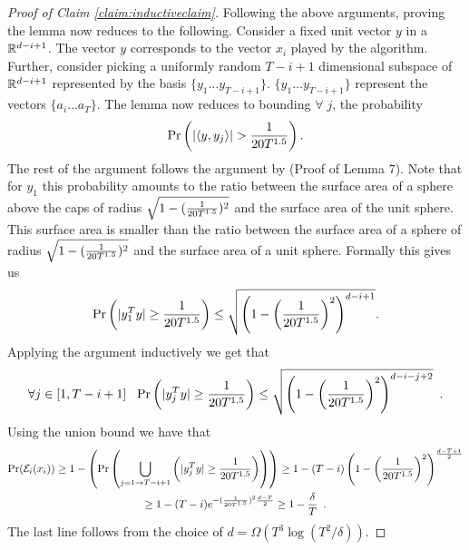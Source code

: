 \begin{proof}[Proof of Claim \ref{claim:inductiveclaim}]
  Following the above arguments, proving the lemma now reduces to the following. Consider a fixed unit vector $y$ in a ${\mathbb R}^{d-i+1}$. The vector $y$ corresponds to the vector $x_i$ played by the algorithm. Further, consider picking a uniformly random $T - i + 1$ dimensional subspace of ${\mathbb R}^{d - i + 1}$ represented by the basis $\{y_1 \ldots y_{T-i+1}\}$. $\{y_1 \ldots y_{T - i +1}\}$ represent the vectors $\{a_i \ldots a_T\}$. The lemma now reduces to bounding $\forall\;j$, the probability 
  \[\mathrm{Pr}\left(|\langle y, y_j \rangle| > \frac{1}{20T^{1.5}}\right) .\]
  The rest of the argument follows the argument by \cite{WoodworthSrebro2016}(Proof of Lemma 7). Note that 
  for $y_1$ this probability amounts to the ratio between the surface area of a sphere above the caps of radius $\sqrt{1 - (\frac{1}{20T^{1.5}})^2}$ and the surface area of the unit sphere. This surface area is smaller than the ratio between the surface area of a sphere of radius $\sqrt{1 - (\frac{1}{20T^{1.5}})^2}$ and the surface area of a unit sphere. Formally this gives us 
  \[ \mathrm{Pr}\left(|y_1^T y| \geq \frac{1}{20T^{1.5}}\right) \leq \sqrt{\left(1 - \left(\frac{1}{20T^{1.5}}\right)^2\right)^{d-i+1}}.\]
  Applying the argument inductively we get that
  \[ \forall j \in [1, T-i+1] \;\;\; \mathrm{Pr}\left(|y_j^T y| \geq \frac{1}{20T^{1.5}}\right) \leq \sqrt{\left(1 - \left(\frac{1}{20T^{1.5}}\right)^2\right)^{d-i-j+2}}\enspace.\]
  Using the union bound we have that
  \begin{multline}
    \mathrm{Pr}(\mathcal{E}_i(x_i)) \geq 1 - \left( \mathrm{Pr} \left(\bigcup_{j=1 \rightarrow T-i+1} \left(|y_j^T y| \geq \frac{1}{20T^{1.5}}\right)\right)\right) \geq 1 - (T - i)\left(1 - \left(\frac{1}{20T^{1.5}}\right)^2\right)^{\frac{d-T+1}{2}} \\ \geq 1 - (T - i)e^{- (\frac{1}{20T^{1.5}})^2\frac{d-T}{2}} \geq 1 - \frac{\delta}{T} \enspace.
  \end{multline}
   \[ \] 
   The last line follows from the choice of $d = \Omega\left(T^3\log(T^2/\delta)\right)$.
\end{proof}